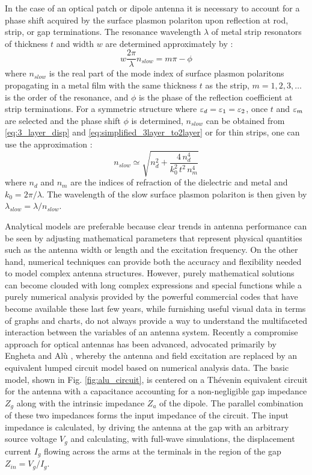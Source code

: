 In the case of an optical patch or dipole antenna it is necessary to account for a phase shift acquired by the surface plasmon polariton upon reflection at rod, strip, or gap terminations. The resonance wavelength $\lambda$ of metal strip resonators of thickness $t$ and width $w$ are determined approximately by \cite{Sondergaard2007}:
%
\begin{equation}
  w \frac{2 \pi}{\lambda} n_{slow} = m\pi  - \phi
  \label{eq:resonant_lambda}
\end{equation}
%
where $n_{slow}$ is the real part of the mode index of surface plasmon polaritons propagating in a metal film with the same thickness $t$ as the strip, $m = 1,2,3,\dotsc $ is the order of the resonance, and $\phi$ is the phase of the reflection coefficient at strip terminations. For a symmetric structure where $\varepsilon_d = \varepsilon_1 = \varepsilon_2$, once $t$ and $\varepsilon_m$ are selected and the phase shift $\phi$ is determined, $n_{slow}$ can be obtained from \eqref{eq:3_layer_disp} and \eqref{eq:simplified_3layer_to2layer} or for thin strips, one can use the approximation \cite{Sondergaard2008}:
%
\begin{equation}
  n_{slow} \simeq \sqrt {n_d^2 + \frac{4 \, n_d^4}{k_0^2 \, t^2 \, n_m^4}}
  \label{eq:n_approx}
\end{equation}
%
where $n_d$ and $n_m$ are the indices of refraction of the dielectric and metal and $k_0 = 2 \pi /\lambda$. The wavelength of the slow surface plasmon polariton is then given by $\lambda_{slow} = \lambda/ n_{slow}$.

Analytical models are preferable because clear trends in antenna performance can be seen by adjusting mathematical parameters that represent physical quantities such as the antenna width or length and the excitation frequency. On the other hand, numerical techniques can provide both the accuracy and flexibility needed to model complex antenna structures. However, purely mathematical solutions can become clouded with long complex expressions and special functions while a purely numerical analysis provided by the powerful commercial codes that have become available these last few years, while furnishing useful visual data in terms of graphs and charts, do not always provide a way to understand the multifaceted interaction between the variables of an antenna system. Recently a compromise approach for optical antennas has been advanced, advocated primarily by Engheta and Alù \cite{Engheta2005,Alu2007,Zhao2011,9781107014145}, whereby the antenna and field excitation are replaced by an equivalent lumped circuit model based on
numerical analysis data. The basic model, shown in Fig. \ref{fig:alu_circuit}, is centered on a Thévenin equivalent circuit for the antenna with a capacitance accounting for a non-negligible gap
impedance $Z_g$ along with the intrinsic impedance $Z_a$ of the dipole. The parallel combination of these two impedances forms the input impedance of the circuit. The input impedance is calculated, by driving the antenna at the gap with an arbitrary source voltage $V_g$ and calculating, with full-wave simulations, the displacement current $I_g$ flowing across the arms at the terminals in the region of the gap $Z_{in} = V_g / I_g$.

